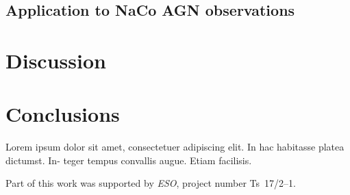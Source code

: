 \documentclass{aa}
\begin{document}
\subsection{Application to NaCo AGN observations}

\section{Discussion}

\section{Conclusions}
Lorem ipsum dolor sit amet,
consectetuer adipiscing elit. In hac habitasse platea dictumst. In-
teger tempus convallis augue. Etiam facilisis.

\begin{acknowledgements}
      Part of this work was supported by \emph{ESO}, project
      number Ts~17/2--1.
\end{acknowledgements}





%
\end{document}
